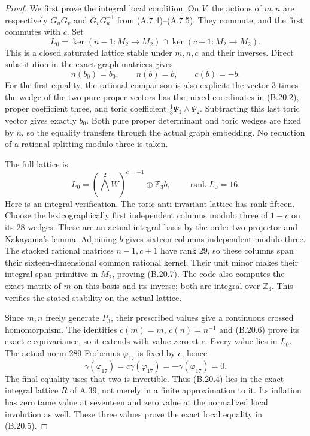 \begin{proof}
We first prove the integral local condition. On $V$,
the actions of $m,n$ are respectively $G_uG_v$ and
$G_vG_u^{-1}$ from (A.7.4)--(A.7.5). They commute,
and the first commutes with $c$. Set
\[
 L_0=\ker(n-1:M_2\to M_2)\cap\ker(c+1:M_2\to M_2).
\]
This is a closed saturated lattice stable under
$m,n,c$ and their inverses. Direct substitution
in the exact graph matrices gives
\[
 n(b_0)=b_0,\qquad n(b)=b,
 \qquad c(b)=-b.                                         \tag{B.20.6}
\]
For the first equality, the rational comparison
is also explicit: the vector $3$ times the wedge
of the two pure proper vectors has the mixed
coordinates in (B.20.2), proper coefficient three,
and toric coefficient
$\frac13\Psi_1\wedge\Psi_2$. Subtracting this
last toric vector gives exactly $b_0$.
Both pure proper determinant and toric wedges are
fixed by $n$, so the equality transfers through
the actual graph embedding. No reduction of a
rational splitting modulo three is taken.

The full lattice is
\[
           L_0=(\bigwedge^2W)^{c=-1}\oplus\mathbb Z_3b,
           \qquad \operatorname{rank}L_0=16.             \tag{B.20.7}
\]
Here is an integral verification. The toric
anti-invariant lattice has rank fifteen.
Choose the lexicographically first independent
columns modulo three of $1-c$ on its $28$
wedges. These are an actual integral basis by
the order-two projector and Nakayama's lemma.
Adjoining $b$ gives sixteen columns independent
modulo three. The stacked rational matrices
$n-1,c+1$ have rank $29$, so these columns span
their sixteen-dimensional common rational kernel.
Their unit minor makes their integral span
primitive in $M_2$, proving (B.20.7).
The code also computes the exact matrix of $m$
on this basis and its inverse; both are integral
over $\mathbb Z_3$. This verifies the stated
stability on the actual lattice.

Since $m,n$ freely generate $P_3$, their prescribed
values give a continuous crossed homomorphism.
The identities $c(m)=m$, $c(n)=n^{-1}$ and
(B.20.6) prove its exact $c$-equivariance, so
it extends with value zero at $c$. Every value
lies in $L_0$. The actual norm-$289$ Frobenius
$\varphi_{17}$ is fixed by $c$, hence
\[
 \gamma(\varphi_{17})=c\gamma(\varphi_{17})
                    =-\gamma(\varphi_{17})=0.
                                                               \tag{B.20.8}
\]
The final equality uses that two is invertible.
Thus (B.20.4) lies in the exact integral lattice
$R$ of A.39, not merely in a finite approximation
to it. Its inflation has zero tame value at
seventeen and zero value at the normalized local
involution as well. These three values prove the
exact local equality in (B.20.5).


\end{proof}
